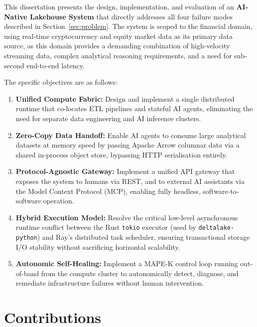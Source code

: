 \documentclass[12pt, a4paper]{report}
\begin{document}
This dissertation presents the design, implementation, and evaluation of an
\textbf{AI-Native Lakehouse System} that directly addresses all four failure modes
described in Section~\ref{sec:problem}.
The system is scoped to the financial domain, using real-time cryptocurrency and equity
market data as its primary data source, as this domain provides a demanding combination
of high-velocity streaming data, complex analytical reasoning requirements, and a need for
sub-second end-to-end latency.

The specific objectives are as follows:

\begin{enumerate}[label=\textbf{O\arabic*.}]

  \item \textbf{Unified Compute Fabric:} Design and implement a single distributed
  runtime that co-locates ETL pipelines and stateful AI agents, eliminating the need for
  separate data engineering and AI inference clusters.

  \item \textbf{Zero-Copy Data Handoff:} Enable AI agents to consume large analytical
  datasets at memory speed by passing Apache Arrow columnar data via a shared in-process
  object store, bypassing HTTP serialisation entirely.

  \item \textbf{Protocol-Agnostic Gateway:} Implement a unified API gateway that exposes
  the system to humans via REST, and to external AI assistants via the Model
  Context Protocol (MCP), enabling fully headless, software-to-software operation.

  \item \textbf{Hybrid Execution Model:} Resolve the critical low-level asynchronous
  runtime conflict between the Rust \texttt{tokio} executor (used by
  \texttt{deltalake-python}) and Ray's distributed task scheduler, ensuring transactional
  storage I/O stability without sacrificing horizontal scalability.

  \item \textbf{Autonomic Self-Healing:} Implement a MAPE-K control loop running
  out-of-band from the compute cluster to autonomically detect, diagnose, and remediate
  infrastructure failures without human intervention.

\end{enumerate}

\section{Contributions}
\label{sec:contributions}
\end{document}
